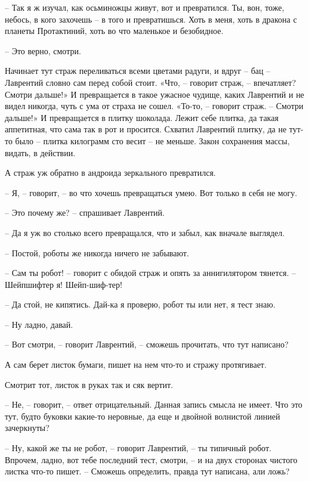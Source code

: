 \documentclass[ebook,oneside,final,openright]{memoir}
\begin{document}
– Так я ж изучал, как осьминожцы живут, вот и превратился. Ты, вон, тоже, небось, в кого захочешь – в того и превратишься. Хоть в меня, хоть в дракона с планеты Протактиний, хоть во что маленькое и безобидное. \par
– Это верно, смотри. \par
\par
Начинает тут страж переливаться всеми цветами радуги, и вдруг – бац – Лаврентий словно сам перед собой стоит. «Что, – говорит страж, – впечатляет? Смотри дальше!» И превращается в такое ужасное чудище, каких Лаврентий и не видел никогда, чуть с ума от страха не сошел. «То-то, – говорит страж. – Смотри дальше!» И превращается в плитку шоколада. Лежит себе плитка, да такая аппетитная, что сама так в рот и просится. Схватил Лаврентий плитку, да не тут-то было – плитка килограмм сто весит – не меньше. Закон сохранения массы, видать, в действии. \par
\par
А страж уж обратно в андроида зеркального превратился. \par
– Я, – говорит, – во что хочешь превращаться умею. Вот только в себя не могу. \par
– Это почему же? – спрашивает Лаврентий.\par
– Да я уж во столько всего превращался, что и забыл, как вначале выглядел. \par
– Постой, роботы же никогда ничего не забывают. \par
– Сам ты робот! – говорит с обидой страж и опять за аннигилятором тянется. – Шейпшифтер я! Шейп-шиф-тер! \par
– Да стой, не кипятись. Дай-ка я проверю, робот ты или нет, я тест знаю. \par
– Ну ладно, давай. \par
– Вот смотри, – говорит Лаврентий, – сможешь прочитать, что тут написано? \par
А сам берет листок бумаги, пишет на нем что-то и стражу протягивает. \par
Смотрит тот, листок в руках так и сяк вертит. \par
– Не, – говорит, – ответ отрицательный. Данная запись смысла не имеет. Что это тут, будто буковки какие-то неровные, да еще и двойной волнистой линией зачеркнуты? \par
– Ну, какой же ты не робот, – говорит Лаврентий, – ты типичный робот. Впрочем, ладно, вот тебе последний тест, смотри, – и на двух сторонах чистого листка что-то пишет. – Сможешь определить, правда тут написана, али ложь? \par
\end{document}
